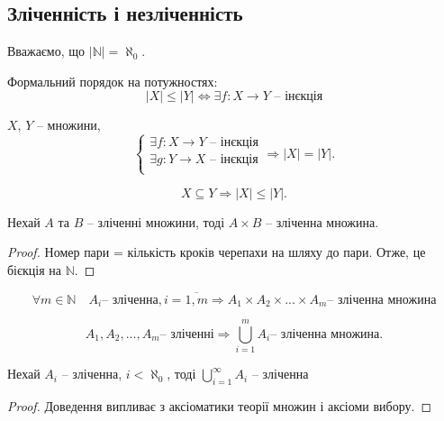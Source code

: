 \subsection{Зліченність і незліченність}

Вважаємо, що $|\mathbb{N}| = \aleph_0$.

\begin{definition}
    Формальний порядок на потужностях:
    $$|X| \leqslant |Y| \Leftrightarrow \exists f: X \rightarrow Y \text{ -- інєкція}$$
\end{definition}

\begin{theorem}
    $X$, $Y$ -- множини, 
    $$\left\{ \begin{array}{l}
        \exists f: X \rightarrow Y \text{ -- інєкція} \\
        \exists g: Y \rightarrow X \text{ -- інєкція} \\
    \end{array} \right. \Rightarrow |X| = |Y|.$$
\end{theorem}

\begin{remark}
    $$X \subseteq Y \Rightarrow |X| \leqslant |Y|.$$
\end{remark}

\begin{theorem}
    Нехай $A$ та $B$ -- зліченні множини, тоді
    $A \times B$ -- зліченна множина.
\end{theorem}
\begin{proof}
    

    Номер пари = кількість кроків черепахи на шляху до пари.
    Отже, це бієкція на $\mathbb{N}$.
\end{proof}

\begin{corollary}
    $$\forall  m \in \mathbb{N} \quad A_i \text{-- зліченна}, i = \overline{1, m}
    \Rightarrow A_1 \times A_2 \times ... \times A_m \text{-- зліченна множина}$$
\end{corollary}

\begin{theorem}
    $$A_1, A_2, ..., A_m \text{-- зліченні}
    \Rightarrow \bigcup\limits_{i = 1}^{m} A_i \text{-- зліченна множина}.$$
\end{theorem}

\begin{theorem}
    Нехай $A_i$ -- зліченна, $i < \aleph_0$,    
    тоді $\bigcup\limits_{i=1}^{\infty} A_i$ -- зліченна
\end{theorem}
\begin{proof}
    Доведення випливає з аксіоматики теорії
    множин і аксіоми вибору.
\end{proof}

